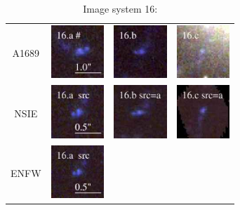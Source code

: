 \documentclass[useAMS,usenatbib]{mn2e}
\begin{document}
\clearpage

\begin{table}
  \caption{Image system 16:}\vspace{0mm}
  \begin{tabular}{cccc}
    \multicolumn{1}{m{1cm}}{{\Large A1689}}
    & \multicolumn{1}{m{1.7cm}}{\includegraphics[height=2.00cm,clip]{figs/nsie_img/rgb.img_16_a.ps}}
    & \multicolumn{1}{m{1.7cm}}{\includegraphics[height=2.00cm,clip]{figs/nsie_img/rgb.img_16_b.ps}}
    & \multicolumn{1}{m{1.7cm}}{\includegraphics[height=2.00cm,clip]{figs/nsie_img/rgb.img_16_c.ps}} \\
    \multicolumn{1}{m{1cm}}{{\Large NSIE}}
    & \multicolumn{1}{m{1.7cm}}{\includegraphics[height=2.00cm,clip]{figs/nsie_img/rgb.src_16_a.ps}}
    & \multicolumn{1}{m{1.7cm}}{\includegraphics[height=2.00cm,clip]{figs/nsie_img/rgb.pre_16_b_a_tri.ps}}
    & \multicolumn{1}{m{1.7cm}}{\includegraphics[height=2.00cm,clip]{figs/nsie_img/rgb.pre_16_c_a_tri.ps}} \\
    \multicolumn{1}{m{1cm}}{{\Large ENFW}}
    & \multicolumn{1}{m{1.7cm}}{\includegraphics[height=2.00cm,clip]{figs/enfw_img/rgb.src_16_a.ps}}

\end{tabular}
\end{table}
\end{document}
